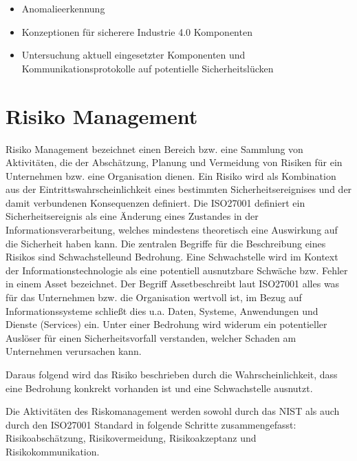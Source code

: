 \begin{itemize}
\item Anomalieerkennung
\item Konzeptionen für sicherere Industrie 4.0 Komponenten
\item Untersuchung aktuell eingesetzter Komponenten und Kommunikationsprotokolle auf potentielle Sicherheitslücken
\end{itemize}

\section{Risiko Management}

Risiko Management bezeichnet einen Bereich bzw. eine Sammlung von Aktivitäten, die der Abschätzung, Planung und Vermeidung von Risiken für ein Unternehmen bzw. eine Organisation dienen. Ein Risiko wird als Kombination aus der Eintrittswahrscheinlichkeit eines bestimmten Sicherheitsereignises und der damit verbundenen Konsequenzen definiert. Die ISO27001 
definiert ein Sicherheitsereignis als eine Änderung eines Zustandes in der Informationsverarbeitung, welches mindestens theoretisch eine Auswirkung auf die Sicherheit haben kann. 
Die zentralen Begriffe für die Beschreibung eines Risikos sind \glqq Schwachstelle\grqq     und \glqq Bedrohung\grqq . Eine Schwachstelle wird im Kontext der Informationstechnologie als eine potentiell ausnutzbare Schwäche bzw. Fehler in einem Asset bezeichnet. Der Begriff \glqq Asset\grqq  beschreibt laut ISO27001 alles was für das Unternehmen bzw. die Organisation wertvoll ist, im Bezug auf Informationssysteme schließt dies u.a. Daten, Systeme, Anwendungen und Dienste (Services) ein. Unter einer Bedrohung wird widerum ein potentieller Auslöser für einen Sicherheitsvorfall verstanden, welcher Schaden am Unternehmen verursachen kann.

Daraus folgend wird das Risiko beschrieben durch die Wahrscheinlichkeit, dass eine Bedrohung konkrekt vorhanden ist und eine Schwachstelle ausnutzt.


Die Aktivitäten des Riskomanagement werden sowohl durch das NIST als auch durch den ISO27001 Standard in folgende Schritte zusammengefasst: Risikoabschätzung, Risikovermeidung, Risikoakzeptanz und Risikokommunikation.

